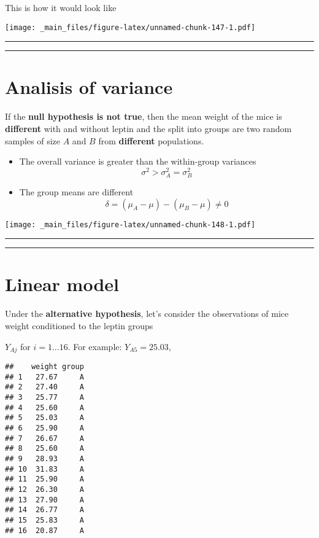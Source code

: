\documentclass[
]{book}
\begin{document}
This is how it would look like

\texttt{[image: \_main\_files/figure-latex/unnamed-chunk-147-1.pdf]}

\begin{center}\rule{0.5\linewidth}{0.5pt}\end{center}

\begin{center}\rule{0.5\linewidth}{0.5pt}\end{center}

\hypertarget{analisis-of-variance}{%
\section{Analisis of variance}\label{analisis-of-variance}}

If the \textbf{null hypothesis is not true}, then the mean weight of the mice is \textbf{different} with and without leptin and the split into groups are two random samples of size \(A\) and \(B\) from \textbf{different} populations.

\begin{itemize}
\item
  The overall variance is greater than the within-group variances \[\sigma^2> \sigma^2_A=\sigma^2_B\]
\item
  The group means are different \[\delta=(\mu_A-\mu)-(\mu_B-\mu)\neq 0\]
\end{itemize}

\texttt{[image: \_main\_files/figure-latex/unnamed-chunk-148-1.pdf]}

\begin{center}\rule{0.5\linewidth}{0.5pt}\end{center}

\begin{center}\rule{0.5\linewidth}{0.5pt}\end{center}

\hypertarget{linear-model}{%
\section{Linear model}\label{linear-model}}

Under the \textbf{alternative hypothesis}, let's consider the observations of mice weight conditioned to the leptin groups

\(Y_{Aj}\) for \(i=1...16\). For example: \(Y_{A5}=25.03\),

\begin{verbatim}
##    weight group
## 1   27.67     A
## 2   27.40     A
## 3   25.77     A
## 4   25.60     A
## 5   25.03     A
## 6   25.90     A
## 7   26.67     A
## 8   25.60     A
## 9   28.93     A
## 10  31.83     A
## 11  25.90     A
## 12  26.30     A
## 13  27.90     A
## 14  26.77     A
## 15  25.83     A
## 16  20.87     A
\end{verbatim}
\end{document}
